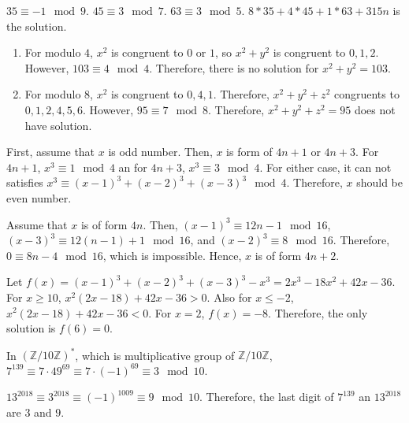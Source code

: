 \documentclass[12pt]{article}
\newenvironment{problem}[2][Problem]{\begin{trivlist}
\item[\hskip \labelsep {\bfseries #1}\hskip \labelsep {\bfseries #2.}]}{\end{trivlist}}
\begin{document}
$35\equiv -1 \mod 9$. $45\equiv 3 \mod 7$. $63 \equiv 3 \mod 5$. $8*35+4*45+1*63+315n$ is the solution.

\begin{problem}{4}
\end{problem}
\begin{enumerate}
\item[(i)] For modulo $4$, $x^2$ is congruent to $0$ or $1$, so $x^2+y^2$ is congruent to $0,1,2$. However, $103\equiv 4 \mod 4$. Therefore, there is no solution for $x^2+y^2=103$.
\item[(ii)] For modulo $8$, $x^2$ is congruent to $0, 4, 1$. Therefore, $x^2+y^2+z^2$ congruents to $0, 1, 2, 4, 5, 6$. However, $95\equiv 7 \mod 8$. Therefore, $x^2+y^2+z^2=95$ does not have solution.
\end{enumerate}
\newpage
\begin{problem}{5}
\end{problem}


First, assume that $x$ is odd number. Then, $x$ is form of $4n+1$ or $4n+3$. For $4n+1$, $x^3\equiv 1 \mod 4$ an for $4n+3$, $x^3\equiv 3 \mod 4$. For either case, it can not satisfies $x^3\equiv(x-1)^3+(x-2)^3+(x-3)^3 \mod 4$. Therefore, $x$ should be even number.

Assume that $x$ is of form $4n$. Then, $(x-1)^3\equiv 12n-1 \mod 16$, $(x-3)^3\equiv 12(n-1)+1 \mod 16$, and $(x-2)^3\equiv 8 \mod 16$. Therefore, $0\equiv 8n-4 \mod 16$, which is impossible. Hence, $x$ is of form $4n+2$.

Let $f(x)=(x-1)^3+(x-2)^3+(x-3)^3-x^3=2x^3-18x^2+42x-36$. For $x\geq 10$, $x^2(2x-18)+42x-36>0$. Also for $x\leq -2$, $x^2(2x-18)+42x-36<0$. For $x=2$, $f(x)=-8$. Therefore, the only solution is $f(6)=0$.


\begin{problem}{6}
\end{problem}
In $(\mathbb{Z}/10\mathbb{Z})^*$, which is multiplicative group of $\mathbb{Z}/10\mathbb{Z}$, $7^{139}\equiv7\cdot 49^{69}\equiv 7\cdot (-1)^{69}\equiv 3 \mod 10$.

$13^{2018}\equiv 3^{2018}\equiv (-1)^{1009}\equiv 9 \mod 10$. Therefore, the last digit of $7^{139}$ an $13^{2018}$ are $3$ and $9$.
\end{document}
